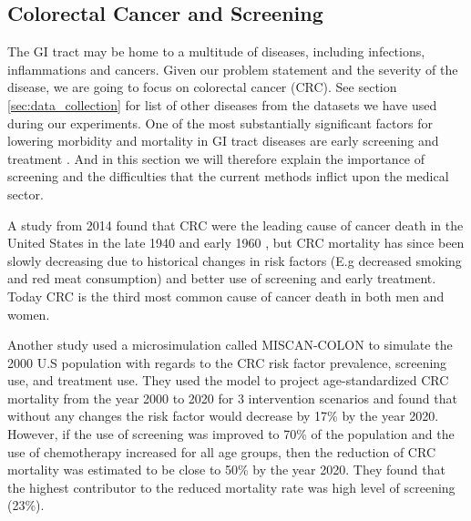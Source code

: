 \documentclass[thesis.tex]{subfiles}
\begin{document}



\subsection{Colorectal Cancer and Screening} \label{sec:colon_cancer}
The GI tract may be home to a multitude of diseases, including infections, inflammations and cancers. Given our problem statement and the severity of the disease, we are going to focus on colorectal cancer (CRC). See section \ref{sec:data_collection} for list of other diseases from the datasets we have used during our experiments. One of the most substantially significant factors for lowering morbidity and mortality in GI tract diseases are early screening and treatment \cite{ColorectalCancer14, CancerStatistics10}. And in this section we will therefore explain the importance of screening and the difficulties that the current methods inflict upon the medical sector.

A study from 2014 found that CRC were the leading cause of cancer death in the United States in the late 1940 and early 1960 \cite{CancerStatistics10}, but CRC mortality has since been slowly decreasing due to historical changes in risk factors (E.g decreased smoking and red meat consumption) and better use of screening and early treatment. Today CRC is the third most common cause of cancer death in both men and women. 

Another study used a microsimulation called MISCAN-COLON \cite{HowMuch06} to simulate the 2000 U.S population with regards to the CRC risk factor prevalence, screening use, and treatment use. They used the model to project age-standardized CRC mortality from the year 2000 to 2020 for 3 intervention scenarios and found that without any changes the risk factor would decrease by 17\% by the year 2020. However, if the use of screening was improved to 70\% of the population and the use of chemotherapy increased for all age groups, then the reduction of CRC mortality was estimated to be close to 50\% by the year 2020. They found that the highest contributor to the reduced mortality rate was high level of screening (23\%).
\end{document}
